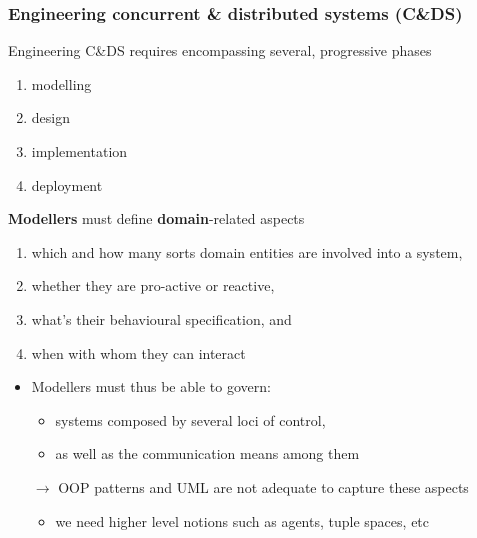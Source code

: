 \documentclass[handout]{beamer}\mode<presentation>{\usetheme{AMSCesenaPurpleAndGold}}
\begin{document}
\begin{frame}[allowframebreaks]
	\frametitle{Engineering concurrent \& distributed systems (C\&DS)}
	
	Engineering C\&DS requires encompassing several, progressive phases
	\begin{enumerate}
		\item modelling
		\item design
		\item implementation
		\item deployment
	\end{enumerate}
	
	\framebreak
	
	\begin{block}{\textbf{Modellers} must define \textbf{domain}-related aspects}
		\begin{enumerate}
			\item which and how many sorts \alert{domain entities} are involved into a system,
			\item whether they are \alert{pro-active} or \alert{reactive},
			\item what's their \alert{behavioural specification}, and
			\item when with whom they can \alert{interact}
		\end{enumerate}
	\end{block}

	\bigskip
	
	\begin{itemize}
		\item Modellers must thus be able to govern:
		\begin{itemize}
			\item systems composed by several \alert{loci of control}, 
			\item as well as the \alert{communication means} among them
		\end{itemize}
	
		\bigskip
	
		\item[$\rightarrow$] OOP patterns and UML are not adequate to capture these aspects
		\begin{itemize}
			\item we need higher level notions such as \alert{agents}, \alert{tuple spaces}, etc
		\end{itemize}
	\end{itemize}

	\framebreak
	

\end{frame}
\end{document}

